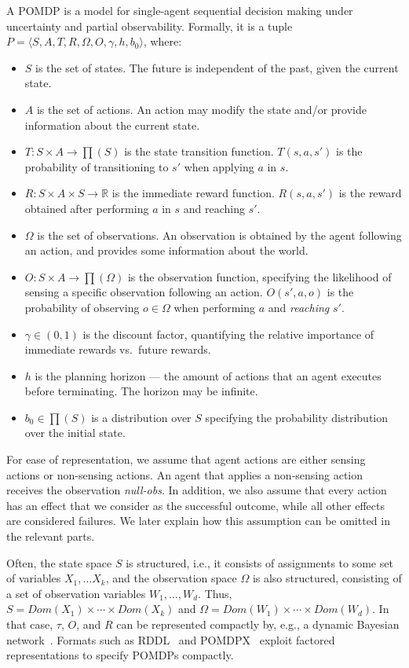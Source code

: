 \documentclass[letterpaper]{article} %
\theoremstyle{definition}
\begin{document}
A POMDP is a model for single-agent sequential decision making under uncertainty and partial observability.
Formally, it is a tuple $P=\langle S, A, T, R, \Omega, O, \gamma, h, b_0 \rangle$, where:
\begin{itemize}
\item
$S$ is the set of states. The future is independent of the past, given the current state.
\item
$A$ is the set of actions. An action may modify the state and/or
provide information about the current state.
\item
$T: S \times A \rightarrow \prod(S)$ is the state transition function.  $T(s, a, s')$ is the probability of transitioning to $s'$ when applying $a$ in $s$. 
\item
$R:S \times A \times S \rightarrow \mathbb{R}$  is the immediate reward function. $R(s,a, s')$ is the reward obtained after performing $a$ in $s$  and reaching $s'$. 
\item
$\Omega$ is the set of observations. An observation is obtained by the agent following an action, and provides some  information about the world.
\item
$O:S \times A \rightarrow \prod (\Omega)$ is the observation function, specifying the likelihood of sensing a specific observation following an action. $O(s', a, o)$ is the probability of observing $o\in \Omega$ when performing $a$ and \emph{reaching} $s'$. 
\item
$\gamma \in (0,1)$ is the discount factor, quantifying the relative importance of immediate rewards vs.~future rewards.
\item
$h$ is the planning horizon --- the amount of actions that an agent executes before terminating. The horizon may be infinite.

\item
$b_0\in \prod(S)$ is a distribution over $S$ specifying the probability distribution over the initial state.
\end{itemize}

For ease of representation, we assume that agent actions are either sensing actions or non-sensing actions. An agent that applies a non-sensing action receives the observation {\em null-obs}. In addition, we also assume that every action has 
an effect that we consider as the successful outcome, while all other effects are considered failures. We later explain how this assumption can be omitted in the relevant parts.

Often, the state space $S$ is structured, i.e., it consists of assignments to some set of variables $X_1,\ldots X_k$, and the observation space $\Omega$ is
also structured, consisting of a set of observation variables $W_1,\ldots, W_d$. 
Thus, $S=Dom(X_1)\times\cdots\times Dom(X_k)$ and
$\Omega = Dom(W_1)\times\cdots\times Dom(W_d)$. 
In that case, $\tau$, $O$, and $R$ can be represented compactly by, e.g., a dynamic Bayesian network~\cite{BAYESNETWORK}. Formats such as RDDL~\cite{RDDL} and POMDPX~\cite{POMDPX}
exploit factored representations to specify POMDPs compactly.
\end{document}
